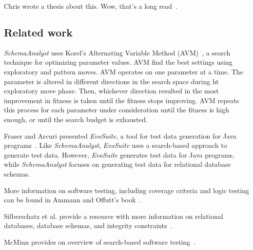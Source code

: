 Chris wrote a thesis about this. Wow, that's a long read~\cite{wright2015mutation}.

\subsection{Related work}
\textit{SchemaAnalyst} uses Korel's Alternating Variable Method (AVM)~\cite{Korel:AVM},
a search technique for optimizing parameter values. AVM find the best settings using 
exploratory and pattern moves. AVM operates on one parameter at a time. The parameter is
altered in different directions in the search space during ht exploratory move phase.  Then,
whichever direction resulted in the most improvement in fitness is taken until the fitness stops 
improving. AVM repeats this process for each parameter under consideration until the fitness is
high enough, or until the search budget is exhausted.

Fraser and Arcuri presented \textit{EvoSuite}, a tool for test data generation for
Java programs~\cite{Fraser2011evosuite}.
Like \textit{SchemaAnalyst}, \textit{EvoSuite} uses a search-based approach 
to generate test data. However, \textit{EvoSuite} generates test data for Java programs, while
\textit{SchemaAnalyst} focuses on generating test data for relational database schemas.

More information on software testing, including coverage criteria and logic testing
can be found in Ammann and Offutt's book~\cite{ammann2008}.

Silberschatz et al. provide a resource with more information on relational databases,
database schemas, and integrity constraints~\cite{databasebook}.

McMinn provides on overview of search-based software testing~\cite{STVR:STVR294}.
